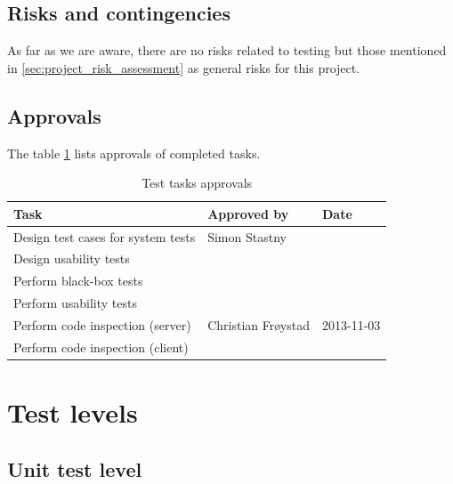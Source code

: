 \documentclass[11pt]{book}
\begin{document}
\subsection{Risks and contingencies}

As far as we are aware, there are no risks related to testing but those mentioned in \ref{sec:project_risk_assessment} as general risks for this project.

\subsection{Approvals}

The table \ref{tab:test_plan_approvals} lists approvals of completed tasks.

\begin{table}[H]
    \centering
    \begin{tabular}{| l | l | l |}
        \hline
        Task                                & Approved by             & Date           \\ \hline
        Design test cases for system tests  & Simon Stastny           &                \\ \hline
        Design usability tests              &                         &                \\ \hline
        Perform black-box tests             &                         &                \\ \hline
        Perform usability tests             &                         &                \\ \hline
        Perform code inspection (server)    & Christian Frøystad      & 2013-11-03     \\ \hline
        Perform code inspection (client)    &                         &                \\ \hline
    \end{tabular}
    \label{tab:test_plan_approvals}
    \caption{Test tasks approvals}
\end{table}


\section{Test levels}

\subsection{Unit test level}
\end{document}
